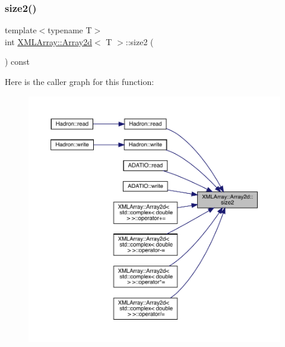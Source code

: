 \mbox{\label{classXMLArray_1_1Array2d_a76f5ee9f75435c61089021f8cfbb6bf8}} 
\subsubsection{\texorpdfstring{size2()}{size2()}\hspace{0.1cm}{\footnotesize\ttfamily [1/2]}}
{\footnotesize\ttfamily template$<$typename T$>$ \\
int \mbox{\hyperlink{classXMLArray_1_1Array2d}{X\+M\+L\+Array\+::\+Array2d}}$<$ T $>$\+::size2 (\begin{DoxyParamCaption}{ }\end{DoxyParamCaption}) const\hspace{0.3cm}{\ttfamily [inline]}}

Here is the caller graph for this function\+:\nopagebreak
\begin{figure}[H]
\begin{center}
\leavevmode
\includegraphics[width=350pt]{dc/ddc/classXMLArray_1_1Array2d_a76f5ee9f75435c61089021f8cfbb6bf8_icgraph}
\end{center}
\end{figure}
\mbox{\label{classXMLArray_1_1Array2d_a76f5ee9f75435c61089021f8cfbb6bf8}} 
